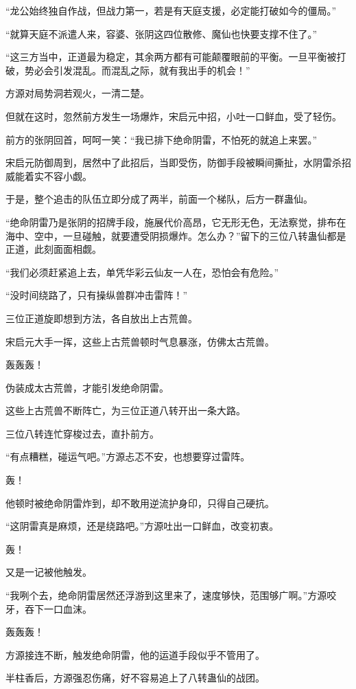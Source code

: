 \begin{this_body}
“龙公始终独自作战，但战力第一，若是有天庭支援，必定能打破如今的僵局。”

“就算天庭不派遣人来，容婆、张阴这四位散修、魔仙也快要支撑不住了。”

“这三方当中，正道最为稳定，其余两方都有可能颠覆眼前的平衡。一旦平衡被打破，势必会引发混乱。而混乱之际，就有我出手的机会！”

方源对局势洞若观火，一清二楚。

但就在这时，忽然前方发生一场爆炸，宋启元中招，小吐一口鲜血，受了轻伤。

前方的张阴回首，呵呵一笑：“我已排下绝命阴雷，不怕死的就追上来罢。”

宋启元防御周到，居然中了此招后，当即受伤，防御手段被瞬间撕扯，水阴雷杀招威能着实不容小觑。

于是，整个追击的队伍立即分成了两半，前面一个梯队，后方一群蛊仙。

“绝命阴雷乃是张阴的招牌手段，施展代价高昂，它无形无色，无法察觉，排布在海中、空中，一旦碰触，就要遭受阴损爆炸。怎么办？”留下的三位八转蛊仙都是正道，此刻面面相觑。

“我们必须赶紧追上去，单凭华彩云仙友一人在，恐怕会有危险。”

“没时间绕路了，只有操纵兽群冲击雷阵！”

三位正道旋即想到方法，各自放出上古荒兽。

宋启元大手一挥，这些上古荒兽顿时气息暴涨，仿佛太古荒兽。

轰轰轰！

伪装成太古荒兽，才能引发绝命阴雷。

这些上古荒兽不断阵亡，为三位正道八转开出一条大路。

三位八转连忙穿梭过去，直扑前方。

“有点糟糕，碰运气吧。”方源忐忑不安，也想要穿过雷阵。

轰！

他顿时被绝命阴雷炸到，却不敢用逆流护身印，只得自己硬抗。

“这阴雷真是麻烦，还是绕路吧。”方源吐出一口鲜血，改变初衷。

轰！

又是一记被他触发。

“我咧个去，绝命阴雷居然还浮游到这里来了，速度够快，范围够广啊。”方源咬牙，吞下一口血沫。

轰轰轰！

方源接连不断，触发绝命阴雷，他的运道手段似乎不管用了。

半柱香后，方源强忍伤痛，好不容易追上了八转蛊仙的战团。


\end{this_body}
